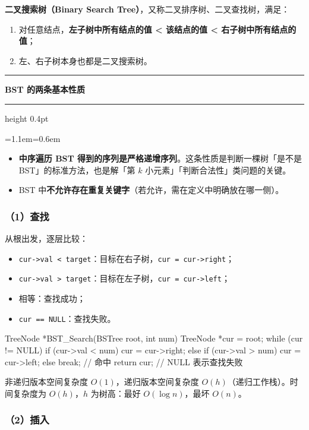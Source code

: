 \documentclass[11pt,openany,UTF8]{ctexbook}
\newcommand{\callouthead}[2]{%
  \par\addvspace{7pt}\noindent
  {\color{#1}\rule[-0.15em]{3pt}{1.05em}}\hspace{0.5em}%
  {\bfseries\color{#1}#2}\par\nobreak\vspace{-0.35em}%
  {\color{rulesep}\hrule height 0.4pt}\nobreak\vspace{0.45em}%
  \begingroup\small\setlength{\parindent}{0pt}%
  \leftskip=1.1em\rightskip=0.6em\noindent\ignorespaces}
\newcommand{\calloutend}{\par\endgroup\addvspace{7pt}}
\newenvironment{callkey}[1]{\callouthead{keybar}{#1}}{\calloutend}
\begin{document}
\textbf{二叉搜索树（Binary Search Tree）}，又称二叉排序树、二叉查找树，满足：

\begin{enumerate}
\item 对任意结点，\textbf{左子树中所有结点的值 < 该结点的值 < 右子树中所有结点的值}；
\item 左、右子树本身也都是二叉搜索树。
\end{enumerate}
\begin{callkey}{BST 的两条基本性质}
\begin{itemize}
\item \textbf{中序遍历 BST 得到的序列是严格递增序列}。这条性质是判断一棵树「是不是 BST」的标准方法，也是解「第 $k$ 小元素」「判断合法性」类问题的关键。
\item BST 中\textbf{不允许存在重复关键字}（若允许，需在定义中明确放在哪一侧）。
\end{itemize}
\end{callkey}

\subsubsection{（1）查找}

从根出发，逐层比较：

\begin{itemize}
\item \texttt{cur->\allowbreak{}val <\allowbreak{} target}：目标在右子树，\texttt{cur =\allowbreak{} cur->\allowbreak{}right}；
\item \texttt{cur->\allowbreak{}val >\allowbreak{} target}：目标在左子树，\texttt{cur =\allowbreak{} cur->\allowbreak{}left}；
\item 相等：查找成功；
\item \texttt{cur =\allowbreak{}=\allowbreak{} NULL}：查找失败。
\end{itemize}
\begin{codebox}
TreeNode *BST_Search(BSTree root, int num) {
    TreeNode *cur = root;
    while (cur != NULL) {
        if (cur->val < num)       cur = cur->right;
        else if (cur->val > num)  cur = cur->left;
        else                      break;      // 命中
    }
    return cur;   // NULL 表示查找失败
}
\end{codebox}

非递归版本空间复杂度 $O(1)$，递归版本空间复杂度 $O(h)$（递归工作栈）。时间复杂度为 $O(h)$，$h$ 为树高：最好 $O(\log n)$，最坏 $O(n)$。

\subsubsection{（2）插入}
\end{document}
